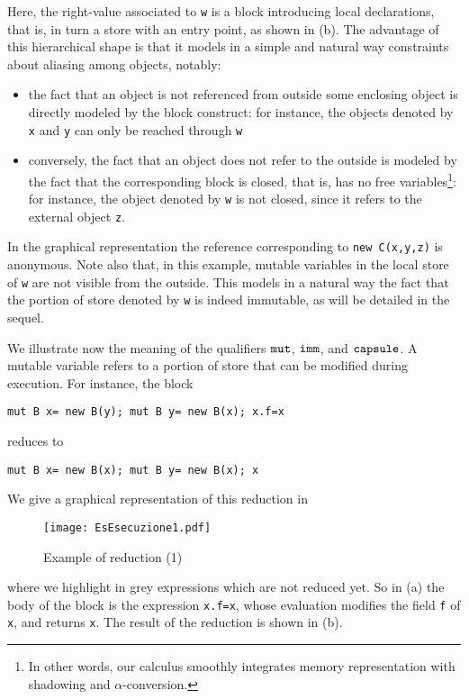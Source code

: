 Here, the {right-value} associated to \lstinline{w}{} is a block introducing local declarations, that is, in turn a store {with an entry point}, as shown in (b). 
The advantage of this hierarchical shape is that it models in a simple and natural way constraints about aliasing among objects, notably:
\begin{itemize}
\item the fact that an object is not referenced from outside some enclosing object is directly modeled by the block construct: for instance, the objects denoted by \lstinline{x}{} and \lstinline{y}{} can only be reached through \lstinline{w}{}
\item conversely, the fact that an object does not refer to the outside is modeled by the fact that the corresponding block is closed, that is, has no free variables\footnote{In other words, our calculus smoothly integrates memory representation with shadowing and $\alpha$-conversion.}: for instance, the object denoted by \lstinline{w}{} is not closed, since it refers to the external object \lstinline{z}{}.
\end{itemize}
In the graphical representation the reference corresponding to \lstinline{new C(x,y,z)}{} is anonymous.
Note also that, in this example, mutable variables in the local store of \lstinline{w}{} are not visible from the outside. This models in a natural way the fact that the portion of store denoted by \lstinline{w}{} is indeed immutable, as will be detailed in the sequel.

We illustrate now the meaning of the qualifiers $\texttt{mut}$, $\texttt{imm}$, and $\texttt{capsule}$.
A mutable variable refers to a portion of store that can be modified during execution. For instance, the block 
\begin{lstlisting}
mut B x= new B(y); mut B y= new B(x); x.f=x
\end{lstlisting}
reduces to
\begin{lstlisting}
mut B x= new B(x); mut B y= new B(x); x
\end{lstlisting}
We give a graphical representation of this reduction in 
\begin{figure}[ht]
\begin{center}
\texttt{[image: EsEsecuzione1.pdf]}
\end{center}
\caption{Example of reduction (1)} \label{fig:esRed1}
\end{figure}
 where we
highlight in grey expressions which {are not reduced yet}. So in  (a) the body of the block is the expression \lstinline{x.f=x}{}, whose evaluation
modifies the field \lstinline{f}{} of \lstinline{x}{}, and returns \lstinline{x}{}. The result of the reduction is shown in (b). 

